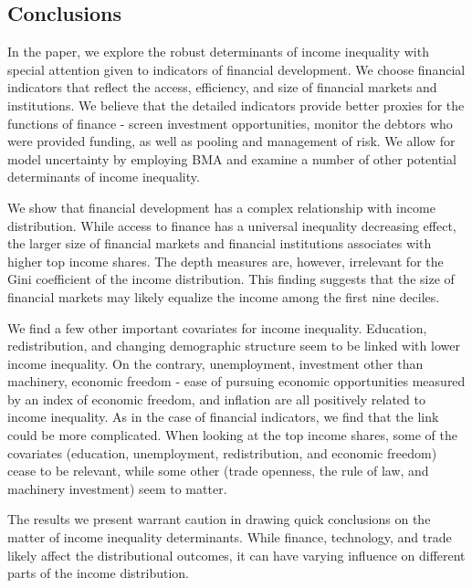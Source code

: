 \begin{refsection}
%
%
%
%
%

\section{Conclusions}
\label{ch4sec:conclusion}
In the paper, we explore the robust determinants of income inequality with special attention given to indicators of financial development. We choose financial indicators that reflect the access, efficiency, and size of financial markets and institutions. We believe that the detailed indicators provide better proxies for the functions of finance - screen investment opportunities, monitor the debtors who were provided funding, as well as pooling and management of risk. We allow for model uncertainty by employing \ac{BMA} and examine a number of other potential determinants of income inequality. 

We show that financial development has a complex relationship with income distribution. While access to finance has a universal inequality decreasing effect, the larger size of financial markets and financial institutions associates with higher top income shares. The depth measures are, however, irrelevant for the Gini coefficient of the income distribution. This finding suggests that the size of financial markets may likely equalize the income among the first nine deciles. 

We find a few other important covariates for income inequality. Education, redistribution, and changing demographic structure seem to be linked with lower income inequality. On the contrary, unemployment, investment other than machinery, economic freedom - ease of pursuing economic opportunities measured by an index of economic freedom, and inflation are all positively related to income inequality. As in the case of financial indicators, we find that the link could be more complicated. When looking at the top income shares, some of the covariates (education, unemployment, redistribution, and economic freedom) cease to be relevant, while some other (trade openness, the rule of law, and machinery investment) seem to matter.

The results we present warrant caution in drawing quick conclusions on the matter of income inequality determinants. While finance, technology, and trade likely affect the distributional outcomes, it can have varying influence on different parts of the income distribution.



\end{refsection}
